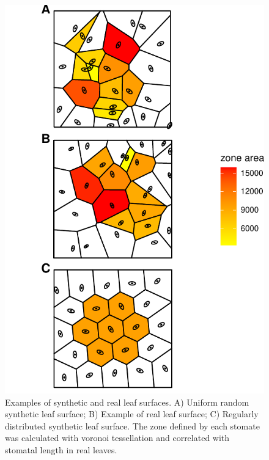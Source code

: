 \documentclass[12pt,halfline,a4paper,]{ouparticle}
\begin{document}
\begin{figure}[ht]
\includegraphics[width = \textwidth]{figures/tessellation-example.pdf}
\caption{Examples of synthetic and real leaf surfaces.  A) Uniform random synthetic leaf surface; B) Example of real leaf surface; C) Regularly distributed synthetic leaf surface. The zone defined by each stomate was calculated with voronoi tessellation and correlated with stomatal length in real leaves.}
\label{fig:tessellation-example}
\end{figure}
\end{document}

